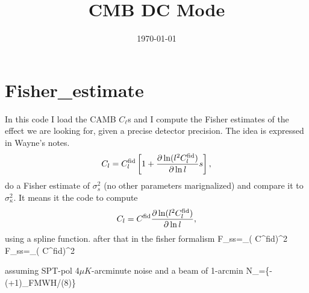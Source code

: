 



\title{CMB DC Mode}
\author{}
\date{\today}

\section{Fisher\_estimate}

In this code I load the CAMB $C_{\ell}$s and I compute the Fisher estimates of the effect we are looking for, given a precise detector precision. The idea is expressed in Wayne's notes.
\begin{equation}
C_l = C_l^{\rm fid} \left[ 1+ \frac{\partial \ln (l^2 C_l^{\rm fid} )}{\partial \ln l} s \right],
\end{equation}
do a Fisher estimate of $\sigma_s^2$ (no other parameters marignalized) and compare it to $\sigma_\kappa^2$.  
It means it the code to compute
\begin{equation}
C_l =  C^{\rm fid}\frac{\partial \ln (l^2 C_l^{\rm fid}) }{\partial \ln l},
\end{equation}
using  a spline function.
after that in the fisher formalism
\ben
F_{ss}=\sum_{\ell}\left( C^{\rm fid}\right)^{2}
\een
\ben
F_{ss}=\sum_{\ell}\left( C^{\rm fid}\right)^{2}
\een

assuming SPT-pol 4$\mu K$-arcminute noise and a beam of 1-arcmin
\be
N_{\ell}=\exp\{-\ell(\ell+1)\theta_{FMWH}/(8)\}
\ee


